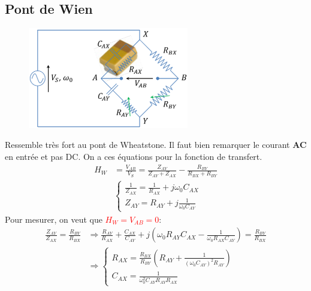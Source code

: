\documentclass{report}
\begin{document}
\subsection{Pont de Wien}
\begin{figure}
\centering
\includegraphics[width=7cm]{img/Wien.png}
\end{figure}
Ressemble très fort au pont de Wheatstone. Il faut bien remarquer le courant \textbf{AC} en entrée et pas DC. On a ces équations pour la fonction de transfert.
\begin{align*}
H_W &= \frac{V_{AB}}{V_S} = \frac{Z_{AY}}{Z_{AY} + Z_{AX}} - \frac{R_{BY}}{R_{BX} + R_{BY}}\\
& \begin{cases}
\frac{1}{Z_{AX}} = \frac{1}{R_{AX}} + j \omega_0 C_{AX}\\
Z_{AY} = R_{AY} + j \frac{1}{\omega_0 C_{AY}}
\end{cases}
\end{align*}
Pour mesurer, on veut que \textcolor{red}{$H_W = V_{AB} = 0$}:
\begin{align*}
\frac{Z_{AY}}{Z_{AX}} = \frac{R_{BY}}{R_{BX}} & \Longrightarrow \frac{R_{AY}}{R_{AX}} + \frac{C_{AX}}{C_{AY}} + j \left( \omega_0 R_{AY} C_{AX} - \frac{1}{\omega_0 R_{AX} C_{AY}} \right) = \frac{R_{BY}}{R_{BX}}\\
& \Longrightarrow \begin{cases}
R_{AX} = \frac{R_{BX}}{R_{BY}} \left( R_{AY} + \frac{1}{(\omega_0 C_{AY})^2 R_{AY}} \right)\\
C_{AX} = \frac{1}{\omega_0^2 C_{AY} R_{AY} R_{AX}}
\end{cases}
\end{align*}
\newpage
\end{document}
